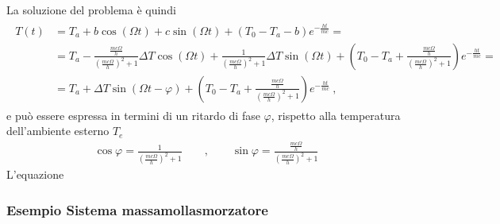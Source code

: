 \documentclass[letterpaper,10pt,italian]{jupyterBook}
\begin{document}
\sphinxAtStartPar
La soluzione del problema è quindi
\begin{equation*}
\begin{split}\begin{aligned}
  T(t) 
  & = T_a + b \cos(\Omega t) + c \sin(\Omega t) + (T_0 - T_a - b) e^{-\frac{ht}{mc}} = \\
  & = T_a -\frac{\frac{mc\Omega}{h}}{\left(\frac{m c \Omega}{h}\right)^2 + 1} \Delta T \cos(\Omega t) + 
           \frac{ 1      }{\left(\frac{m c \Omega}{h}\right)^2 + 1} \Delta T\sin(\Omega t) + \left(T_0 - T_a + \frac{\frac{mc\Omega}{h}}{\left(\frac{m c \Omega}{h}\right)^2 + 1} \right) e^{-\frac{ht}{mc}} = \\
  & = T_a + \Delta T \sin\left( \Omega t - \varphi \right) + \left( T_0 - T_a + \frac{\frac{mc\Omega}{h}}{\left(\frac{m c \Omega}{h}\right)^2 + 1} \right) e^{-\frac{ht}{mc}} \ ,
\end{aligned}\end{split}
\end{equation*}
\sphinxAtStartPar
e può essere espressa in termini di un ritardo di fase \(\varphi\), rispetto alla temperatura dell’ambiente esterno \(T_e\)
\begin{equation*}
\begin{split}\cos \varphi = \frac{1}{\left(\frac{m c \Omega}{h}\right)^2 + 1} \qquad , \qquad \sin \varphi = \frac{\frac{mc\Omega}{h}}{\left(\frac{m c \Omega}{h}\right)^2 + 1}\end{split}
\end{equation*}
\sphinxAtStartPar
L’equazione
\subsubsection*{Esempio \sphinxhyphen{} Sistema massa\sphinxhyphen{}molla\sphinxhyphen{}smorzatore}

\sphinxAtStartPar
{}  
\end{document}
